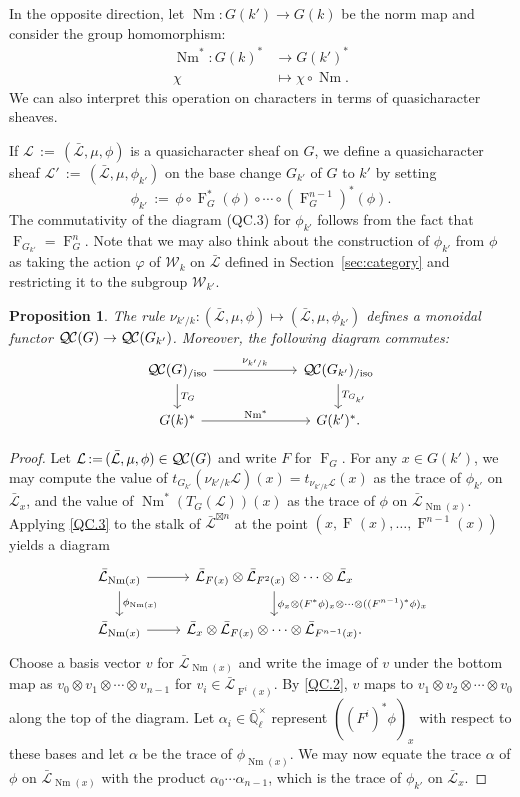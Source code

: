 \documentclass{amsart}
\theoremstyle{plain}
\newtheorem{proposition}[theorem]{Proposition}
\theoremstyle{definition}
\theoremstyle{remark}
\newcommand{\EE}{\mathbb{\bar Q}_\ell}
\newcommand{\EEx}{\EE^\times}
\newcommand{\Weil}[1]{\mathcal{W}_{#1}}
\newcommand{\Frob}[1]{\operatorname{F}_{#1}}
\DeclareMathOperator{\Nm}{Nm}
\newcommand{\ceq}{{\, :=\, }}
\newcommand{\qcs}[1]{{\mathcal{#1}}}
\newcommand{\gqcs}[1]{{\mathcal{\bar #1}}}
\newcommand{\QC}{{\mathcal{Q\hskip-0.8pt C}}}
\newcommand{\QCiso}[1]{\QC(#1)_{/\text{iso}}}
\newcommand{\TrFrob}[1]{T_{#1}}
\begin{document}
In the opposite direction, let $\Nm : G(k') \to G(k)$ be the norm map and consider the group homomorphism:
\begin{align*}
\Nm^* : G(k)^* &\to G(k')^* \\
\chi &\mapsto \chi\circ \Nm.
\end{align*}
We can also interpret this operation on characters in terms of quasicharacter sheaves.

If $\qcs{L} \ceq (\gqcs{L}, \mu, \phi)$ is a quasicharacter sheaf on $G$, we define
a quasicharacter sheaf $\qcs{L}' \ceq (\gqcs{L}, \mu, \phi_{k'})$ on the base change
$G_{k'}$ of $G$ to $k'$ by setting
\[
\phi_{k'} \ceq \phi \circ \Frob{G}^*(\phi) \circ \cdots \circ (\Frob{G}^{n-1})^*(\phi).
\]
The commutativity of the diagram (QC.3) for $\phi_{k'}$
follows from the fact that $\Frob{G_{k'}} = \Frob{G}^n$.
Note that we may also think about the construction of $\phi_{k'}$ from $\phi$
as taking the action $\varphi$ of $\Weil{k}$ on $\gqcs{L}$
defined in Section~\ref{sec:category} and restricting it to the subgroup $\Weil{k'}$.

\begin{proposition}\label{prop:basechange}
 The rule $\nu_{k'/k}: (\gqcs{L}, \mu, \phi) \mapsto (\gqcs{L}, \mu, \phi_{k'})$
 defines a monoidal functor $\QC(G) \to \QC(G_{k'})$.
 Moreover, the following diagram commutes:
\[
\begin{tikzcd}[column sep=60]
\QCiso{G} \rar{\nu_{k'/k}} \dar{\TrFrob{G}} & \QCiso{G_{k'}} \dar{\TrFrob{G_{k'}}} \\
G(k)^*  \rar{\Nm^*} & G(k')^*.
\end{tikzcd}
\]
\end{proposition}
\begin{proof}
Let $\qcs{L} \ceq (\gqcs{L}, \mu, \phi) \in \QC(G)$ and write $F$ for $\Frob{G}$.  For any $x \in G(k')$,
we may compute the value of $t_{G_{k'}}(\nu_{k'/k}\qcs{L})(x)= t_{\nu_{k'/k}\qcs{L}}(x)$ as the trace of $\phi_{k'}$ on $\gqcs{L}_x$,
and the value of $\Nm^*(\TrFrob{G}(\qcs{L}))(x)$ as the trace of $\phi$ on $\gqcs{L}_{\Nm(x)}$.
Applying \ref{QC.3} to the stalk of $\gqcs{L}^{\boxtimes n}$ at the point $(x, \Frob{}(x), \ldots, \Frob{}^{n-1}(x))$ yields a diagram
\[
\begin{tikzcd}
\gqcs{L}_{\Nm(x)} \rar \dar{\phi_{\Nm(x)}} & \gqcs{L}_{F(x)} \otimes \gqcs{L}_{F^2(x)} \otimes \cdots \otimes \gqcs{L}_x
\dar{\phi_x \otimes (F^*\phi)_x \otimes \cdots \otimes ((F^{n-1})^*\phi)_x} \\
\gqcs{L}_{\Nm(x)} \rar & \gqcs{L}_x \otimes \gqcs{L}_{F(x)} \otimes \cdots \otimes \gqcs{L}_{F^{n-1}(x)}.
\end{tikzcd}
\]
Choose a basis vector $v$ for $\gqcs{L}_{\Nm(x)}$ and write the image of $v$ under the
bottom map as $v_0 \otimes v_1 \otimes \cdots \otimes v_{n-1}$
for $v_i \in \gqcs{L}_{\Frob{}^i(x)}$.  By \ref{QC.2}, $v$ maps to
$v_1 \otimes v_2 \otimes \cdots \otimes v_0$ along the top of the diagram.
Let $\alpha_i \in \EEx$ represent $((F^i)^*\phi)_x$ with respect to these bases and let $\alpha$ be
the trace of $\phi_{\Nm(x)}$.  We may now equate the trace $\alpha$ of $\phi$ on $\gqcs{L}_{\Nm(x)}$
with the product $\alpha_0 \cdots \alpha_{n-1}$, which is the trace of $\phi_{k'}$ on $\gqcs{L}_x$.
\end{proof}
\end{document}
